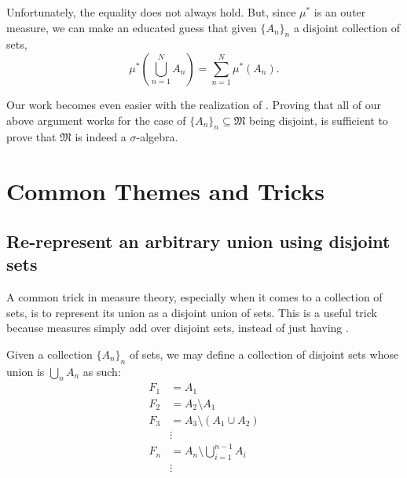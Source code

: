\documentclass[notoc,notitlepage]{tufte-book}
\begin{document}
Unfortunately, the equality does not always hold.
But, since $\mu^*$ is an outer measure,
we can make an educated guess
that given $\{ A_n \}_{n}$ a disjoint collection of sets,
\begin{equation*}
  \mu^* \left( \bigcup_{n=1}^{N} A_n \right) = \sum_{n=1}^{N} \mu^*(A_n).
\end{equation*}

Our work becomes even easier with the realization of .
Proving that all of our above argument works for the case of
$\{ A_n \}_{n} \subseteq \mathfrak{M}$ being disjoint,
is sufficient to prove that $\mathfrak{M}$ is indeed a $\sigma$-algebra.


\chapter{Common Themes and Tricks}%
\label{chp:common_themes_and_tricks}

\section{Re-represent an arbitrary union using disjoint sets}%
\label{sec:re_represent_an_arbitrary_union_using_disjoint_sets}

A common trick in measure theory,
especially when it comes to a collection of sets,
is to represent its union as a disjoint union of sets.
This is a useful trick because measures simply add over disjoint sets,
instead of just having .

\begin{eg}\label{eg:disjoint_rep_of_countable_union}
  Given a collection $\{ A_n \}_{n}$ of sets, we may define a collection of
  disjoint sets whose union is $\bigcup_{n} A_n$ as such:
  \begin{align*}
    F_1 &= A_1 \\
    F_2 &= A_2 \setminus A_1 \\
    F_3 &= A_3 \setminus (A_1 \cup A_2) \\
        &\vdots \\
    F_n &= A_n \setminus \bigcup_{i=1}^{n-1} A_i \\
        &\vdots
  \end{align*}
\end{eg}
\end{document}
